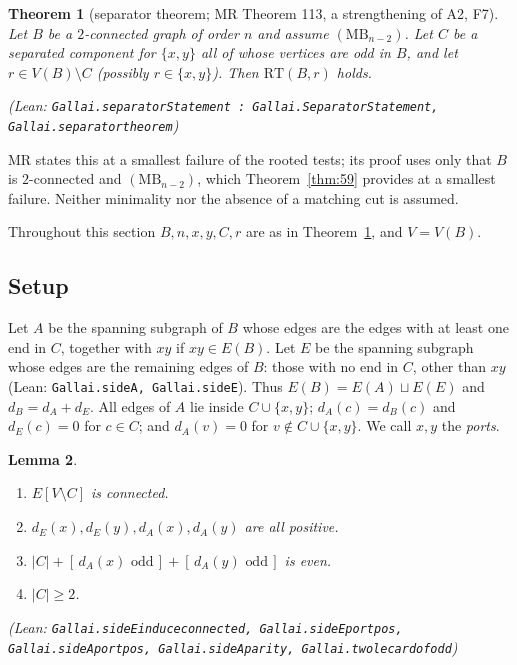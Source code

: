 \documentclass[11pt]{amsart}
\newtheorem{theorem}{Theorem}[section]
\newtheorem{lemma}[theorem]{Lemma}
\theoremstyle{definition}
\theoremstyle{remark}
\renewcommand{\_}{\oldunderscore\allowbreak}
\newcommand{\lean}[1]{\textup{(Lean: {\small\texttt{#1}})}}
\newcommand{\leanst}[1]{\par{\raggedright\small\textup{(Lean: \texttt{#1})}\par}}
\newcommand{\MBU}{\mathrm{MB}}
\newcommand{\RT}{\mathrm{RT}}
\newcommand{\ind}[1]{[\,#1\,]}
\begin{document}
\begin{theorem}[separator theorem; MR Theorem 113, a strengthening of A2, F7]\label{thm:sep}
Let $B$ be a $2$-connected graph of order $n$ and assume $(\MBU_{n-2})$. Let $C$ be a separated
component for $\{x,y\}$ all of whose vertices are odd in $B$, and let $r\in V(B)\setminus C$ (possibly
$r\in\{x,y\}$). Then $\RT(B,r)$ holds.
\leanst{Gallai.separatorStatement : Gallai.SeparatorStatement, Gallai.separator\_theorem}
\end{theorem}

MR states this at a smallest failure of the rooted tests; its proof uses only that $B$ is
$2$-connected and $(\MBU_{n-2})$, which Theorem~\ref{thm:59} provides at a smallest failure. Neither
minimality nor the absence of a matching cut is assumed.

Throughout this section $B,n,x,y,C,r$ are as in Theorem~\ref{thm:sep}, and $V=V(B)$.

\subsection{Setup}
Let $A$ be the spanning subgraph of $B$ whose edges are the edges with at least one end in $C$,
together with $xy$ if $xy\in E(B)$. Let $E$ be the spanning subgraph whose edges are the remaining
edges of $B$: those with no end in $C$, other than $xy$ \lean{Gallai.sideA, Gallai.sideE}. Thus
$E(B)=E(A)\sqcup E(E)$ and $d_B=d_A+d_E$. All edges of $A$ lie inside $C\cup\{x,y\}$; $d_A(c)=d_B(c)$
and $d_E(c)=0$ for $c\in C$; and $d_A(v)=0$ for $v\notin C\cup\{x,y\}$. We call $x,y$ the
\emph{ports}.

\begin{lemma}\label{lem:sides}
\begin{enumerate}[label=\textup{(\alph*)}]
\item $E[V\setminus C]$ is connected.
\item $d_E(x),d_E(y),d_A(x),d_A(y)$ are all positive.
\item $|C|+\ind{d_A(x)\text{ odd}}+\ind{d_A(y)\text{ odd}}$ is even.
\item $|C|\ge2$.
\end{enumerate}
\leanst{Gallai.sideE\_induce\_connected, Gallai.sideE\_port\_pos, Gallai.sideA\_port\_pos,
Gallai.sideA\_parity, Gallai.two\_le\_card\_of\_odd}
\end{lemma}
\end{document}
